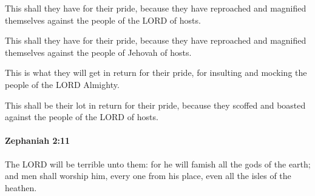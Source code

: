 			This shall they have for their pride, because they have reproached and magnified themselves against the people of the LORD of hosts.

			\begin{versebox}
					\item[BHS] 
					\item[LXX] 
					\item[ASV] This shall they have for their pride, because they have reproached and magnified themselves against the people of Jehovah of hosts.
					\item[NIV] This is what they will get in return for their pride, for insulting and mocking the people of the LORD Almighty.
					\item[NRSV] This shall be their lot in return for their pride, because they scoffed and boasted against the people of the LORD of hosts.
			\end{versebox}

		\paragraph{Zephaniah 2:11} %
			\label{ZEPHANIAH-2-11}

			The LORD will be terrible unto them: for he will famish all the gods of the earth; and men shall worship him, every one from his place, even all the isles of the heathen.

